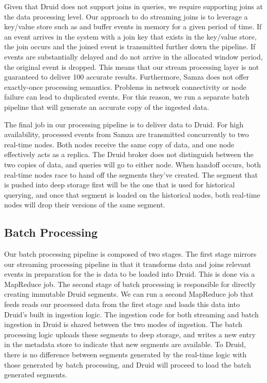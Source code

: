 \documentclass{vldb}
\begin{document}
Given that Druid does not support joins in queries, we require supporting joins
at the data processing level. Our approach to do streaming joins is to leverage
a key/value store such as \cite{fitzpatrick2004distributed} and buffer events in memory for a given
period of time. If an event arrives in the system with a join key that exists
in the key/value store, the join occurs and the joined event is transmitted
further down the pipeline. If events are substantially delayed and do not
arrive in the allocated window period, the original event is dropped. This
means that our stream processing layer is not guaranteed to deliver 100%
accurate results. Furthermore, Samza does not offer exactly-once processing
semantics. Problems in network connectivity or node failure can lead to
duplicated events. For this reason, we run a separate batch pipeline that will
generate an accurate copy of the ingested data.

The final job in our processing pipeline is to deliver data to Druid. For high
availability, processed events from Samza are transmitted concurrently to two
real-time nodes. Both nodes receive the same copy of data, and one node
effectively acts as a replica. The Druid broker does not distinguish between
the two copies of data, and queries will go to either node. When handoff
occurs, both real-time nodes race to hand off the segments they’ve created. The
segment that is pushed into deep storage first will be the one that is used for
historical querying, and once that segment is loaded on the historical nodes,
both real-time nodes will drop their versions of the same segment.

\subsection{Batch Processing}
Our batch processing pipeline is composed of two stages. The first stage
mirrors our streaming processing pipeline in that it transforms data and joins
relevant events in preparation for the is data to be loaded into Druid. This is
done via a MapReduce\cite{dean2008mapreduce} job. The second stage of batch
processing is responsible for directly creating immutable Druid segments. We
can run a second MapReduce job that feeds reads our processed data from the
first stage and loads this data into Druid’s built in ingestion logic. The
ingestion code for both streaming and batch ingestion in Druid is shared
between the two modes of ingestion. The batch processing logic uploads these
segments to deep storage, and writes a new entry in the metadata store to
indicate that new segments are available. To Druid, there is no difference
between segments generated by the real-time logic with those generated by batch
processing, and Druid will proceed to load the batch generated segments.
\end{document}
